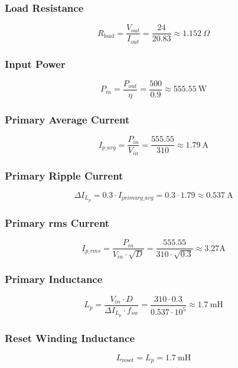 \subsubsection*{Load Resistance}
\[
R_{\text{load}} = \frac{V_{out}}{I_{out}} = \frac{24}{20.83} \approx 1.152\ \Omega
\]
\subsubsection*{Input Power}
\[
P_{in} = \frac{P_{out}}{\eta} = \frac{500}{0.9} \approx 555.55\ \text{W} 
\]
\subsubsection*{Primary Average Current}
\[
I_{p\_avg} = \frac{P_{in}}{V_{in}} = \frac{555.55}{310} \approx 1.79\ \text{A}
\]
\subsubsection*{Primary Ripple Current}
\[
\Delta I_{L_{p}} = 0.3 \cdot I_{primary\_avg} = 0.3 \cdot 1.79 \approx 0.537\ \text{A}
\]
\subsubsection*{Primary rms Current}
\[
I_{p\_rms} = \frac{P_{in}}{V_{in} \cdot \sqrt{D}} = \frac{555.55}{310 \cdot \sqrt{0.3}} \approx 3.27 \text{A}
\]
\subsubsection*{Primary Inductance}
\[
L_p = \frac{V_{in} \cdot D}{\Delta I_{L_p} \cdot f_{sw}} = \frac{310 \cdot 0.3}{0.537 \cdot 10^5} \approx 1.7\ \text{mH}
\]
\subsubsection*{Reset Winding Inductance}
\[
L_{\text{reset}} = L_p = 1.7\ \text{mH}
\]
